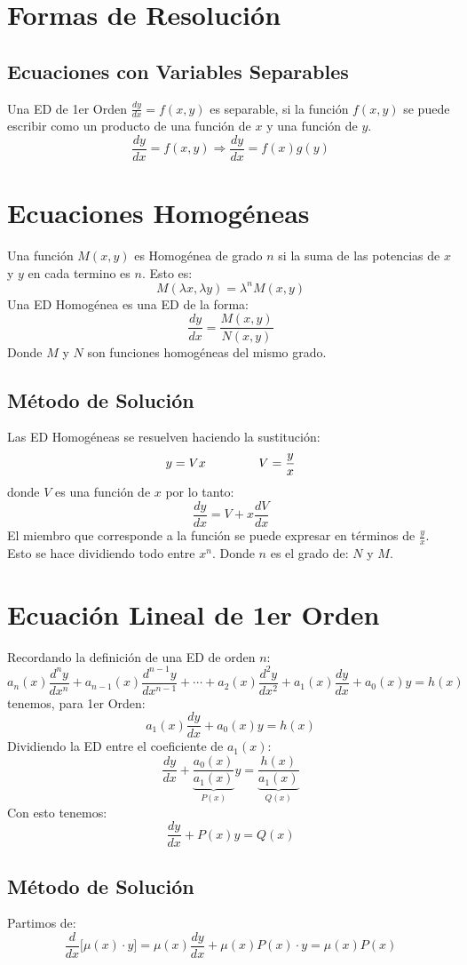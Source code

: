 \section{Formas de Resolución}
\subsection{Ecuaciones con Variables Separables}
Una ED de 1er Orden $\frac{dy}{dx}=f(x,y)$ es separable, si la función $f(x,y)$ se puede escribir como un producto de una función de $x$ y una función de $y$.
$$\dfrac{dy}{dx}=f(x,y)\Rightarrow \dfrac{dy}{dx}=f(x)g(y)$$
\section{Ecuaciones Homogéneas}
Una función $M(x,y)$ es Homogénea de grado $n$ si la suma de las potencias de $x$ y $y$ en cada termino es $n$. Esto es:
$$M(\lambda x,\lambda y)=\lambda^nM(x,y)$$
Una ED Homogénea es una ED de la forma:
$$\dfrac{dy}{dx}=\dfrac{M(x,y)}{N(x,y)}$$
Donde $M$ y $N$ son funciones homogéneas del mismo grado.
\subsection{Método de Solución}
Las ED Homogéneas se resuelven haciendo la sustitución:
$$y=Vx \hspace{1.5cm} V=\dfrac{y}{x}$$
donde $V$ es una función de $x$ por lo tanto:
$$\dfrac{dy}{dx}=V+x\dfrac{dV}{dx}$$
El miembro que corresponde a la función se puede expresar en términos de $\frac{y}{x}$. Esto se hace dividiendo todo entre $x^n$. Donde $n$ es el grado de: $N$ y $M$.
\section{Ecuación Lineal de 1er Orden}
Recordando la definición de una ED de orden $n$:
$$a_n(x)\dfrac{d^ny}{dx^n}+a_{n-1}(x)\dfrac{d^{n-1}y}{dx^{n-1}}+\cdots + a_2(x)\dfrac{d^2y}{dx^2}+a_1(x)\dfrac{dy}{dx}+a_0(x)y=h(x)$$
tenemos, para 1er Orden:
\begin{equation}
a_1(x)\dfrac{dy}{dx}+a_0(x)y=h(x)
\end{equation}
Dividiendo la ED entre el coeficiente de $a_1(x)$:
$$\dfrac{dy}{dx}+\underbrace{\dfrac{a_0(x)}{a_1(x)}}_{P(x)}y=\underbrace{\dfrac{h(x)}{a_1(x)}}_{Q(x)}$$
Con esto tenemos:
\begin{equation}
\dfrac{dy}{dx}+P(x)y=Q(x)
\end{equation}
\subsection{Método de Solución}
Partimos de:
$$\dfrac{d}{dx}\Bigg[\mu(x)\cdot y\Bigg]=\mu(x)\dfrac{dy}{dx}+\mu(x)P(x) \cdot y = \mu(x)P(x) $$

